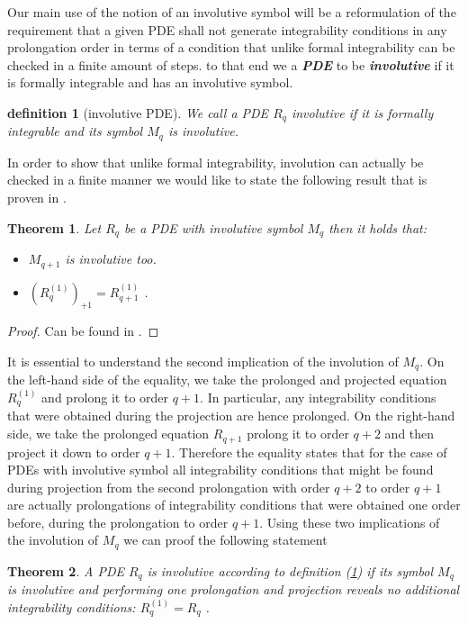 \documentclass[a4paper,12pt, DIV=14, BCOR=5mm, twoside, headsepline, numbers=noenddot]{scrbook}
\newtheorem{theorem}{Theorem}[section]
\newtheorem{definition}{definition}[section]
\begin{document}
Our main use of the notion of an involutive symbol will be a reformulation of the requirement that a given PDE shall not generate integrability conditions in any prolongation order in terms of a condition that unlike formal integrability can be checked in a finite amount of steps. to that end we a \textit{\textbf{PDE}} to be \textit{\textbf{involutive}} if it is formally integrable and has an involutive symbol.
\begin{definition}[involutive PDE] \label{invol}
We call a PDE $R_q$ involutive if it is formally integrable and its symbol $M_q$ is involutive.
\end{definition}
In order to show that unlike formal integrability, involution can actually be checked in a finite manner we would like to state the following result that is proven in \cite{seiler1994analysis}.
\begin{theorem}\label{invoCons}
Let $R_q$ be a PDE with involutive symbol $M_q$ then it holds that:
\begin{itemize}
    \item $M_{q+1}$ is involutive too.
    \item $(R_{q}^{(1)})_{+1} = R_{q+1}^{(1)}$ .
\end{itemize}
\end{theorem}
\begin{proof}
Can be found in \cite{seiler1994analysis}.
\end{proof}
It is essential to understand the second implication of the involution of $M_q$. On the left-hand side of the equality, we take the prolonged and projected equation $R_q^{(1)}$ and prolong it to order $q+1$. In particular, any integrability conditions that were obtained during the projection are hence prolonged. On the right-hand side, we take the prolonged equation $R_{q+1}$ prolong it to order $q+2$ and then project it down to order $q+1$. Therefore the equality states that for the case of PDEs with involutive symbol all integrability conditions that might be found during projection from the second prolongation with order $q+2$ to order $q+1$ are actually prolongations of integrability conditions that were obtained one order before, during the prolongation to order $q+1$.
Using these two implications of the involution of $M_q$ we can proof the following statement
\begin{theorem}
A PDE $R_q$ is involutive according to definition (\ref{invol}) if its symbol $M_q$ is involutive and performing one prolongation and projection reveals no additional integrability conditions: $R_q^{(1)} = R_q$ .
\end{theorem}
\end{document}
